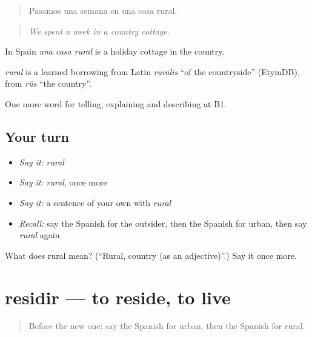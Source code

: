 \begin{quote}
Pasamos una semana en una casa rural.
\end{quote}

\begin{quote}
\emph{We spent a week in a country cottage.}
\end{quote}

In Spain \emph{una casa rural} is a holiday cottage in the country.

\begin{cousinweb}
\emph{rural} is a learned borrowing from Latin \emph{rūrālis} \textquotedblleft{}of the countryside\textquotedblright{} (EtymDB), from \emph{rūs} \textquotedblleft{}the country\textquotedblright{}.
\end{cousinweb}

\begin{grammarlens}[title={What you've built}]
One more word for telling, explaining and describing at B1.
\end{grammarlens}

\subsection*{Your turn}
\begin{itemize}
\raggedright
  \item \emph{Say it:} \emph{rural}
  \item \emph{Say it:} \emph{rural}, once more
  \item \emph{Say it:} a sentence of your own with \emph{rural}
  \item \emph{Recall:} say the Spanish for the outsider, then the Spanish for urban, then say \emph{rural} again
\end{itemize}

\begin{tcolorbox}[breakable,colback=teal!4,colframe=teal!35!black,title={Before you move on}]
What does rural mean? (\textquotedblleft{}Rural, country (as an adjective)\textquotedblright{}.) Say it once more.
\end{tcolorbox}
\section[residir]{residir — to reside, to live}

\label{lesson:ES-C684-residir}



\begin{quote}
Before the new one: say the Spanish for urban, then the Spanish for rural.
\end{quote}

